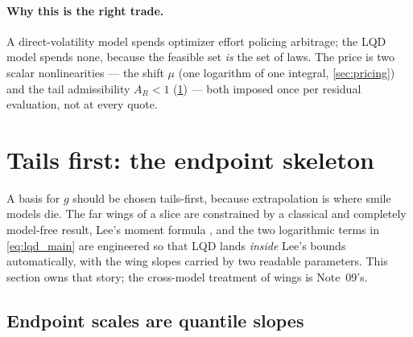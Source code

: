 \documentclass[11pt]{article}
\begin{document}
\paragraph{Why this is the right trade.}  A direct-volatility model spends
optimizer effort policing arbitrage; the LQD model spends none, because the
feasible set \emph{is} the set of laws.  The price is two scalar
nonlinearities --- the shift $\mu$ (one logarithm of one integral,
\cref{sec:pricing}) and the tail admissibility $A_R<1$ (\cref{sec:tails})
--- both imposed once per residual evaluation, not at every quote.

\section{Tails first: the endpoint skeleton}
\label{sec:tails}

A basis for $g$ should be chosen tails-first, because extrapolation is where
smile models die.  The far wings of a slice are constrained by a classical
and completely model-free result, Lee's moment formula \cite{Lee2004}, and
the two logarithmic terms in \eqref{eq:lqd_main} are engineered so that LQD
lands \emph{inside} Lee's bounds automatically, with the wing slopes carried
by two readable parameters.  This section owns that story; the cross-model
treatment of wings is Note~09's.

\subsection{Endpoint scales are quantile slopes}
\end{document}

